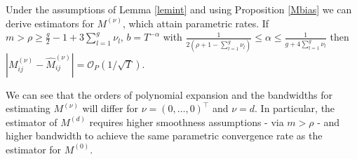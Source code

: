 \begin{remark} 
\label{remark1}
Under the assumptions of Lemma \ref{lemint} and using Proposition \ref{Mbias} we can derive estimators for $M^{(\nu)}$, which attain parametric rates. 
If $m > \rho \geq \frac{g}{2}-1 + 3 \sum_{l=1}^g \nu_l $,  $b=T^{-\alpha}$ with $\frac{1}{2(\rho+1 -\sum_{l=1}^g \nu_l)} \leq \alpha \leq \frac{1}{g+4 \sum_{l=1}^g \nu_l}$ then $|M^{(\nu)}_{ij} - \hat{M}^{(\nu)}_{ij}|=\mathcal{O}_P(1/\sqrt{T})$.
\end{remark}
We can see that the orders of polynomial expansion and the bandwidths for estimating $M^{(\nu)}$ will differ for $\nu=(0,\dots,0)^\top$ and $\nu=d$. In particular, the estimator of $M^{(d)}$ requires higher smoothness assumptions - via $m > \rho$ - and higher bandwidth to achieve the same parametric convergence rate as the estimator for $M^{(0)}$. %

